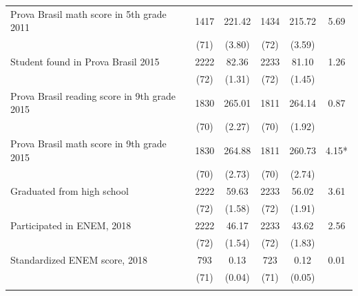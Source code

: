 \documentclass[
	article,			%
	12pt,				%
	oneside,			%
	a4paper,			%
	]{article}
\begin{document}
\begin{table}[h!]
\begin{threeparttable}
\begin{tabular*}{\textwidth}{@{\extracolsep{\fill}}lccccc@{}}
Prova Brasil math score in 5th grade 2011 &       1417 &     221.42 &       1434 &     215.72 &       5.69 \\

           &       (71) &     (3.80) &       (72) &     (3.59) &            \\

Student found in Prova Brasil 2015 &       2222 &      82.36 &       2233 &      81.10 &       1.26 \\

           &       (72) &     (1.31) &       (72) &     (1.45) &            \\

Prova Brasil reading score in 9th grade 2015 &       1830 &     265.01 &       1811 &     264.14 &       0.87 \\

           &       (70) &     (2.27) &       (70) &     (1.92) &            \\

Prova Brasil math score in 9th grade 2015 &       1830 &     264.88 &       1811 &     260.73 &      4.15* \\

           &       (70) &     (2.73) &       (70) &     (2.74) &            \\

Graduated from high school &       2222 &      59.63 &       2233 &      56.02 &       3.61 \\

           &       (72) &     (1.58) &       (72) &     (1.91) &            \\

Participated in ENEM, 2018 &       2222 &      46.17 &       2233 &      43.62 &       2.56 \\

           &       (72) &     (1.54) &       (72) &     (1.83) &            \\

Standardized ENEM score, 2018 &        793 &       0.13 &        723 &       0.12 &       0.01 \\

           &       (71) &     (0.04) &       (71) &     (0.05) &            \\

           &            &            &            &            &            \\


\end{tabular*}
\end{threeparttable}
\end{table}
\end{document}
